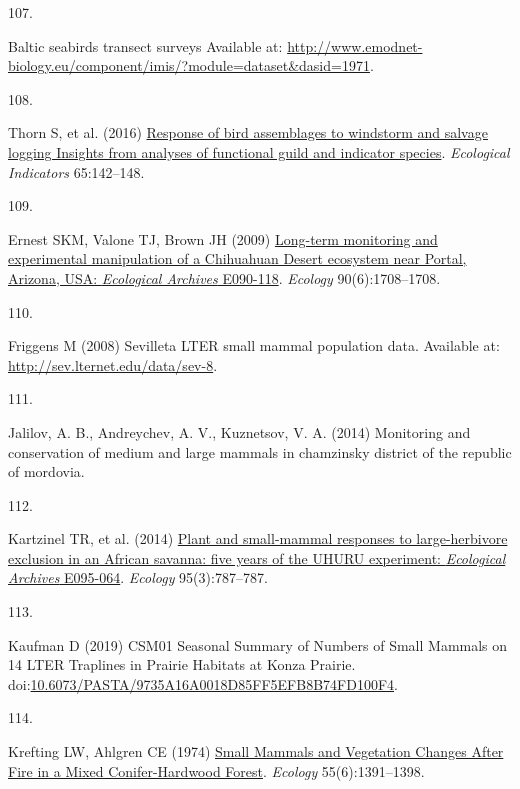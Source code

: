 \documentclass{article}
\newlength{\cslhangindent}
\newlength{\csllabelwidth}
\newlength{\cslentryspacingunit} %
\newenvironment{CSLReferences}[2] %
 {%
  \setlength{\parindent}{0pt}
  \ifodd #1
  \let\oldpar\par
  \def\par{\hangindent=\cslhangindent\oldpar}
  \fi
  \setlength{\parskip}{#2\cslentryspacingunit}
 }%
 {}
\newcommand{\CSLLeftMargin}[1]{\parbox[t]{\csllabelwidth}{#1}}
\newcommand{\CSLRightInline}[1]{\parbox[t]{\linewidth - \csllabelwidth}{#1}\break}
\begin{document}
\begin{CSLReferences}{0}{0}
\leavevmode{}%
\CSLLeftMargin{107. }%
\CSLRightInline{Baltic seabirds transect surveys Available at:
\url{http://www.emodnet-biology.eu/component/imis/?module=dataset\&dasid=1971}.}

\leavevmode{}%
\CSLLeftMargin{108. }%
\CSLRightInline{Thorn S, et al. (2016)
\href{https://doi.org/10.1016/j.ecolind.2015.06.033}{Response of bird
assemblages to windstorm and salvage logging {\textemdash} Insights from
analyses of functional guild and indicator species}. \emph{Ecological
Indicators} 65:142--148.}

\leavevmode{}%
\CSLLeftMargin{109. }%
\CSLRightInline{Ernest SKM, Valone TJ, Brown JH (2009)
\href{https://doi.org/10.1890/08-1222.1}{Long-term monitoring and
experimental manipulation of a Chihuahuan Desert ecosystem near Portal,
Arizona, USA: {\emph{Ecological Archives}} E090-118}. \emph{Ecology}
90(6):1708--1708.}

\leavevmode{}%
\CSLLeftMargin{110. }%
\CSLRightInline{Friggens M (2008) Sevilleta LTER small mammal population
data. Available at: \url{http://sev.lternet.edu/data/sev-8}.}

\leavevmode{}%
\CSLLeftMargin{111. }%
\CSLRightInline{Jalilov, A. B., Andreychev, A. V., Kuznetsov, V. A.
(2014) Monitoring and conservation of medium and large mammals in
chamzinsky district of the republic of mordovia.}

\leavevmode{}%
\CSLLeftMargin{112. }%
\CSLRightInline{Kartzinel TR, et al. (2014)
\href{https://doi.org/10.1890/13-1023R.1}{Plant and small-mammal
responses to large-herbivore exclusion in an African savanna: five years
of the UHURU experiment: {\emph{Ecological Archives}} E095-064}.
\emph{Ecology} 95(3):787--787.}

\leavevmode{}%
\CSLLeftMargin{113. }%
\CSLRightInline{Kaufman D (2019) CSM01 Seasonal Summary of Numbers of
Small Mammals on 14 LTER Traplines in Prairie Habitats at Konza Prairie.
doi:\href{https://doi.org/10.6073/PASTA/9735A16A0018D85FF5EFB8B74FD100F4}{10.6073/PASTA/9735A16A0018D85FF5EFB8B74FD100F4}.}

\leavevmode{}%
\CSLLeftMargin{114. }%
\CSLRightInline{Krefting LW, Ahlgren CE (1974)
\href{https://doi.org/10.2307/1935467}{Small Mammals and Vegetation
Changes After Fire in a Mixed Conifer-Hardwood Forest}. \emph{Ecology}
55(6):1391--1398.}


\end{CSLReferences}
\end{document}

